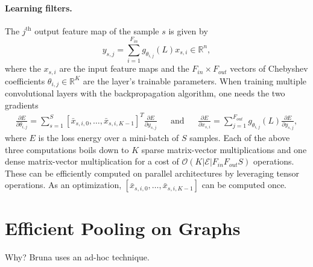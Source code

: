 \documentclass{article}
\newcommand{\E}{\mathcal{E}}
\newcommand{\bO}{\mathcal{O}}
\newcommand{\R}{\mathbb{R}}
\newcommand{\todo}[1]{{\color{red} #1 }}
\begin{document}
\paragraph{Learning filters.} The $j^\text{th}$ output feature map of the sample
$s$ is given by
\begin{equation} \label{eq:filterbank}
	y_{s,j} = \sum_{i=1}^{F_{in}} g_{\theta_{i,j}}(L) x_{s,i} \in \R^n,
\end{equation}
where the $x_{s,i}$ are the input feature maps and the $F_{in} \times F_{out}$ vectors of Chebyshev
coefficients $\theta_{i,j} \in \R^K$ are the layer's trainable parameters. When
training multiple convolutional layers with the backpropagation algorithm, one
needs the two gradients
\begin{align}
	\frac{\partial E}{\partial \theta_{i,j}} =
	\sum_{s=1}^S [\bar{x}_{s,i,0}, \ldots, \bar{x}_{s,i,K-1}]^T
	\frac{\partial E}{\partial y_{s,j}}
	&& \text{and} &&
	\frac{\partial E}{\partial x_{s,i}} =
	\sum_{j=1}^{F_{out}} g_{\theta_{i,j}}(L)
	\frac{\partial E}{\partial y_{s,j}},
\end{align}
where $E$ is the loss energy over a mini-batch of $S$ samples. Each of the
above three computations boils down to $K$ sparse matrix-vector multiplications
and one dense matrix-vector multiplication for a cost of $\bO(K |\E| F_{in}
F_{out} S)$ operations. These can be efficiently computed on parallel
architectures by leveraging tensor operations. As an optimization,
$[\bar{x}_{s,i,0}, \ldots, \bar{x}_{s,i,K-1}]$ can be computed once.

\section{Efficient Pooling on Graphs} \label{sec:pooling}


\todo{Why? Bruna uses an ad-hoc technique.}
\end{document}
